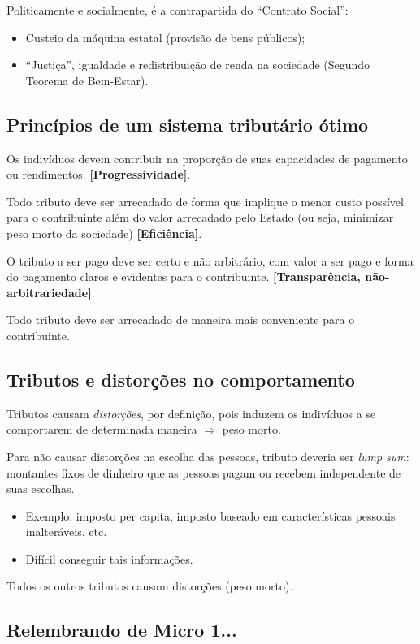\documentclass[a4paper,12pt]{article}[abntex2]
\begin{document}
Politicamente e socialmente, é a contrapartida do ``Contrato Social'':
\begin{itemize}
  \item Custeio da máquina estatal (provisão de bens públicos);
  \item ``Justiça'', igualdade e redistribuição de renda na sociedade (Segundo Teorema de Bem-Estar).
\end{itemize}


\subsection{\textbf{Princípios de um sistema tributário ótimo}}

Os indivíduos devem contribuir na proporção de suas capacidades de pagamento ou rendimentos. \textbf{[Progressividade]}.

Todo tributo deve ser arrecadado de forma que implique o menor custo possível para o contribuinte além do valor arrecadado pelo Estado (ou seja, minimizar peso morto da sociedade) \textbf{[Eficiência]}.

O tributo a ser pago deve ser certo e não arbitrário, com valor a ser pago e forma do pagamento claros e evidentes para o contribuinte.\textbf{ [Transparência, não- arbitrariedade]}.

Todo tributo deve ser arrecadado de maneira mais conveniente para o contribuinte.

\subsection{\textbf{Tributos e distorções no comportamento}}

Tributos causam \textit{distorções}, por definição, pois induzem os indivíduos a se comportarem de determinada maneira $\Rightarrow$ peso morto.

Para não causar distorções na escolha das pessoas, tributo deveria ser \textit{lump sum}: montantes fixos de dinheiro que as pessoas pagam ou recebem independente de suas escolhas.
\begin{itemize}
  \item Exemplo: imposto per capita, imposto baseado em características pessoais inalteráveis, etc.
  \item Difícil conseguir tais informações.
\end{itemize}

Todos os outros tributos causam distorções (peso morto).


\subsection{\textbf{Relembrando de Micro 1...}}
\end{document}
